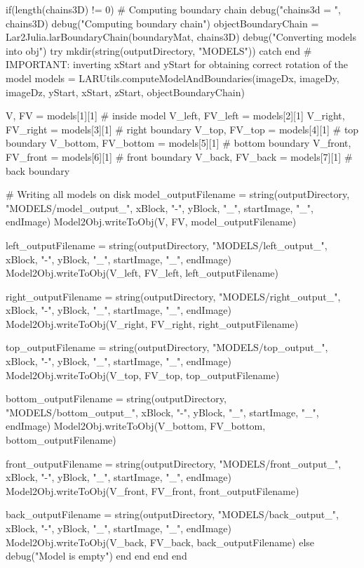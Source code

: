 \documentclass[11pt,oneside]{article}	%
\begin{document}
{      if(length(chains3D) != 0)
        # Computing boundary chain
        debug("chains3d = ", chains3D)
        debug("Computing boundary chain")
        objectBoundaryChain = Lar2Julia.larBoundaryChain(boundaryMat, chains3D)
        debug("Converting models into obj")
        try
          mkdir(string(outputDirectory, "MODELS"))
        catch
        end
        # IMPORTANT: inverting xStart and yStart for obtaining correct rotation of the model
        models = LARUtils.computeModelAndBoundaries(imageDx, imageDy, imageDz, yStart, xStart, zStart, objectBoundaryChain)

        V, FV = models[1][1] # inside model
        V_left, FV_left = models[2][1]
        V_right, FV_right = models[3][1] # right boundary
        V_top, FV_top = models[4][1] # top boundary
        V_bottom, FV_bottom = models[5][1] # bottom boundary
        V_front, FV_front = models[6][1] # front boundary
        V_back, FV_back = models[7][1] # back boundary

        # Writing all models on disk
        model_outputFilename = string(outputDirectory, "MODELS/model_output_", xBlock, "-", yBlock, "_", startImage, "_", endImage)
        Model2Obj.writeToObj(V, FV, model_outputFilename)

        left_outputFilename = string(outputDirectory, "MODELS/left_output_", xBlock, "-", yBlock, "_", startImage, "_", endImage)
        Model2Obj.writeToObj(V_left, FV_left, left_outputFilename)

        right_outputFilename = string(outputDirectory, "MODELS/right_output_", xBlock, "-", yBlock, "_", startImage, "_", endImage)
        Model2Obj.writeToObj(V_right, FV_right, right_outputFilename)

        top_outputFilename = string(outputDirectory, "MODELS/top_output_", xBlock, "-", yBlock, "_", startImage, "_", endImage)
        Model2Obj.writeToObj(V_top, FV_top, top_outputFilename)

        bottom_outputFilename = string(outputDirectory, "MODELS/bottom_output_", xBlock, "-", yBlock, "_", startImage, "_", endImage)
        Model2Obj.writeToObj(V_bottom, FV_bottom, bottom_outputFilename)

        front_outputFilename = string(outputDirectory, "MODELS/front_output_", xBlock, "-", yBlock, "_", startImage, "_", endImage)
        Model2Obj.writeToObj(V_front, FV_front, front_outputFilename)

        back_outputFilename = string(outputDirectory, "MODELS/back_output_", xBlock, "-", yBlock, "_", startImage, "_", endImage)
        Model2Obj.writeToObj(V_back, FV_back, back_outputFilename)
      else
        debug("Model is empty")
      end
    end
  end
end

}
\end{document}
